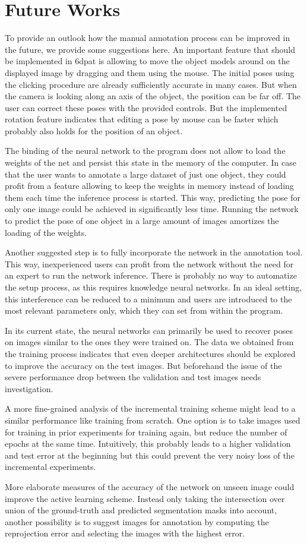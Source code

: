 \chapter{Future Works} \label{chapter:future_work}

To provide an outlook how the manual annotation process can be improved in the future, we provide some suggestions here. An important feature that should be implemented in \ac{6dpat} is allowing to move the object models around on the displayed image by dragging and them using the mouse. The initial poses using the clicking procedure are already sufficiently accurate in many cases. But when the camera is looking along an axis of the object, the position can be far off. The user can correct these poses with the provided controls. But the implemented rotation feature indicates that editing a pose by mouse can be faster which probably also holds for the position of an object.

The binding of the neural network to the program does not allow to load the weights of the net and persist this state in the memory of the computer. In case that the user wants to annotate a large dataset of just one object, they could profit from a feature allowing to keep the weights in memory instead of loading them each time the inference process is started. This way, predicting the pose for only one image could be achieved in significantly less time. Running the network to predict the pose of one object in a large amount of images amortizes the loading of the weights.

Another suggested step is to fully incorporate the network in the annotation tool. This way, inexperienced users can profit from the network without the need for an expert to run the network inference. There is probably no way to automatize the setup process, as this requires knowledge neural networks. In an ideal setting, this interference can be reduced to a minimum and users are introduced to the most relevant parameters only, which they can set from within the program.

In its current state, the neural networks can primarily be used to recover poses on images similar to the ones they were trained on. The data we obtained from the training process indicates that even deeper architectures should be explored to improve the accuracy on the test images. But beforehand the issue of the severe performance drop between the validation and test images needs investigation. 

A more fine-grained analysis of the incremental training scheme might lead to a similar performance like training from scratch. One option is to take images used for training in prior experiments for training again, but reduce the number of epochs at the same time. Intuitively, this probably leads to a higher validation and test error at the beginning but this could prevent the very noisy loss of the incremental experiments.

More elaborate measures of the accuracy of the network on unseen image could improve the active learning scheme. Instead only taking the intersection over union of the ground-truth and predicted segmentation masks into account, another possibility is to suggest images for annotation by computing the reprojection error and selecting the images with the highest error.